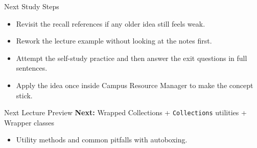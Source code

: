 \documentclass{beamer}
\begin{document}
\begin{frame}{Next Study Steps}
\begin{itemize}[<+->]
  \item Revisit the recall references if any older idea still feels weak.
  \item Rework the lecture example without looking at the notes first.
  \item Attempt the self-study practice and then answer the exit questions in full sentences.
  \item Apply the idea once inside Campus Resource Manager to make the concept stick.
\end{itemize}
  \slidesources{\OOPSUnitVSources}
\end{frame}

\begin{frame}{Next Lecture Preview}
  \textbf{Next:} Wrapped Collections + \texttt{Collections} utilities + Wrapper classes
  \vspace{0.6em}
  \begin{itemize}[<+->]
    \item Utility methods and common pitfalls with autoboxing.
  \end{itemize}
  \slidesources{\OOPSUnitVSources}
\end{frame}
\end{document}
